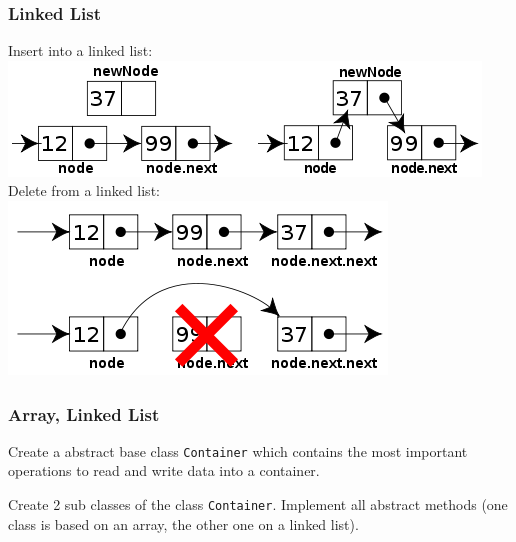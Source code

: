 \begin{frame}[fragile]
\frametitle{Linked List}
Insert into a linked list:\\
\vspace{1mm}
\includegraphics[scale=0.3]{img/linkedlist_insert2.png}\\
\vspace{5mm}
Delete from a linked list:\\
\vspace{1mm}
\includegraphics[scale=0.3]{img/linkedlist_remove2.png}
\end{frame}

\begin{frame}[fragile]
\frametitle{Array, Linked List}
\begin{exercise}
Create a abstract base class \verb|Container| which contains the most
important operations to read and write data into a container.
\end{exercise}
\begin{exercise}
Create 2 sub classes of the class \verb|Container|. Implement all abstract
methods (one class is based on an array, the other one on a linked list).
\end{exercise}
\end{frame}

